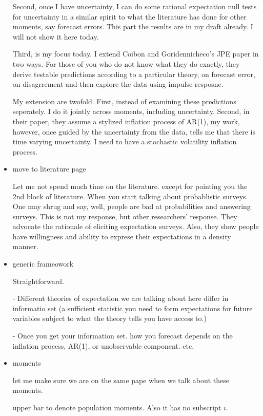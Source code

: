 \documentclass[]{article}
\begin{document}
\begin{itemize}
Second, once I have uncertainty, I can do some rational expectation null tests for uncertainty in a similar spirit to what the literature has done for other moments, say forecast errors. This part the results are in my draft already. I will not show it here today. 

Third, is my focus today. I extend Coibon and Goridennicheco's JPE paper in two ways. For those of you who do not know what they do exactly, they derive testable predictions according to a particular theory, on forecast error, on disagrrement and then explore the data using impulse resposne. 

My extension are twofold. First, instead of examining these predictions seperately. I do it jointly across moments, including uncertainty. 
Second, in their paper, they assume a stylized inflation process of AR(1), my work, however, once guided by the uncertainty from the data, tells me that there is time varying uncertainty. I need to have a stochastic volatility inflation process. 

\item  move to literature page 

Let me not spend much time on the literature. except for pointing you the 2nd block of literature. When you start talking about probablistic surveys. One may shrug and say, well, people are bad at probabilities and answering surveys. This is not my response, but other researchers' response. They advocate the rationale of eliciting expectation surveys. Also, they show people have willingness and ability to exprese their expectations in a density manner. 

\item generic frameowork  

Straightforward. 

- Different theories of expectation we are talking about here differ in informatio set (a sufficient statistic you need to form expectations for future variables subject to what the theory tells you have access to.) 

- Once you get your information set. how you forecast depends on the inflation process, AR(1), or unobservable component. etc. 

\item moments  

let me make sure we are on the same pape when we talk about these moments. 

upper bar to denote population moments. Also it has no subscript $i$. 


\end{itemize}
\end{document}
